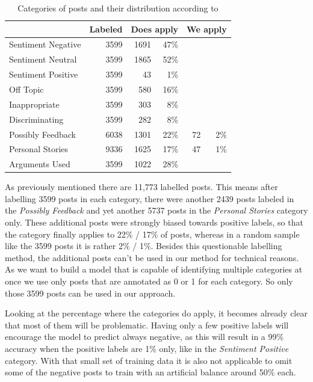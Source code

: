 \documentclass[11pt,a4paper]{article}
\begin{document}
\begin{table}
	\centering\small
	\begin{tabular}{l r r r r r}
		& Labeled & \multicolumn{2}{c}{Does apply} & \multicolumn{2}{c}{We apply} \\
		\hline
		Sentiment Negative & 3599 & 1691 & 47\% \\
		Sentiment Neutral & 3599 & 1865 & 52\% \\
		Sentiment Positive & 3599 & 43 & 1\% \\
		Off Topic & 3599 & 580 & 16\% \\
		Inappropriate & 3599 & 303 & 8\%\\
		Discriminating & 3599 & 282 & 8\%\\
		Possibly Feedback & 6038 & 1301 & 22\% & 72 & 2\%\\
		Personal Stories & 9336 & 1625 & 17\% & 47 & 1\%\\
		Arguments Used & 3599 & 1022 & 28\%\\
	\end{tabular}
	\caption{Categories of posts and their distribution according to \cite{Schabus17}}
	\label{tab:categories}
\end{table}

As previously mentioned there are 11,773 labelled posts. This means after labelling 3599 posts in each category, there were another 2439 posts labeled in the \textit{Possibly Feedback} and yet another 5737 posts in the \textit{Personal Stories} category only.
These additional posts were strongly biased towards positive labels, so that the category finally applies to 22\% / 17\% of posts, whereas in a random sample like the 3599 posts it is rather 2\% / 1\%.
Besides this questionable labelling method, the additional posts can't be used in our method for technical reasons.
As we want to build a model that is capable of identifying multiple categories at once we use only posts that are annotated as 0 or 1 for each category.
So only those 3599 posts can be used in our approach.  

Looking at the percentage where the categories do apply, it becomes already clear that most of them will be problematic. 
Having only a few positive labels will encourage the model to predict always negative, as this will result in a 99\% accuracy when the positive labels are 1\% only, like in the \textit{Sentiment Positive} category. With that small set of training data it is also not applicable to omit some of the negative posts to train with an artificial balance around 50\% each.
\end{document}
